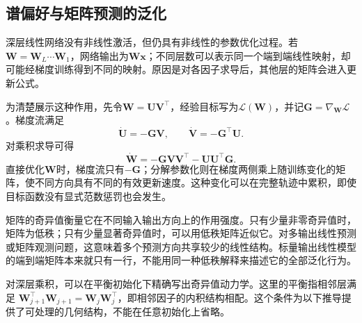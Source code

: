 \subsection{谱偏好与矩阵预测的泛化}

深层线性网络没有非线性激活，但仍具有非线性的参数优化过程。若
$\bm W=\bm W_L\cdots\bm W_1$，网络输出为$\bm W\bm x$；不同层数可以表示同一个端到端线性映射，却可能经梯度训练得到不同的映射。原因是对各因子求导后，其他层的矩阵会进入更新公式。

为清楚展示这种作用，先令$\bm W=\bm U\bm V^\top$，经验目标写为$\mathcal L(\bm W)$，并记$\bm G=\nabla_{\bm W}\mathcal L$。梯度流满足
\[
 \dot{\bm U}=-\bm G\bm V,\qquad
 \dot{\bm V}=-\bm G^\top\bm U.
\]
对乘积求导可得
\begin{equation}
 \dot{\bm W}=-\bm G\bm V\bm V^\top-\bm U\bm U^\top\bm G.
 \label{eq:factorized-gradient-flow}
\end{equation}
直接优化$\bm W$时，梯度流只有$-\bm G$；分解参数化则在梯度两侧乘上随训练变化的矩阵，使不同方向具有不同的有效更新速度。这种变化可以在完整轨迹中累积，即使目标函数没有显式范数惩罚也会发生。

矩阵的奇异值衡量它在不同输入输出方向上的作用强度。只有少量非零奇异值时，矩阵为低秩；只有少量显著奇异值时，可以用低秩矩阵近似它。对多输出线性预测或矩阵观测问题，这意味着多个预测方向共享较少的线性结构。标量输出线性模型的端到端矩阵本来就只有一行，不能用同一种低秩解释来描述它的全部泛化行为。

对深层乘积，可以在平衡初始化下精确写出奇异值动力学。这里的平衡指相邻层满足
$\bm W_{j+1}^\top\bm W_{j+1}=\bm W_j\bm W_j^\top$，即相邻因子的内积结构相配。这个条件为以下推导提供了可处理的几何结构，不能在任意初始化上省略。

